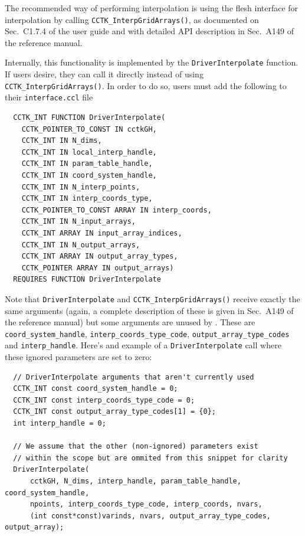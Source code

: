 The recommended way of performing interpolation is using the flesh interface for interpolation by calling \texttt{CCTK\_InterpGridArrays()}, as documented on Sec.~C1.7.4 of the \Cactus\space user guide and with detailed API description in Sec.~A149 of the \Cactus\space reference manual.

Internally, this functionality is implemented by the \texttt{DriverInterpolate} function. If users desire, they can call it directly instead of using \texttt{CCTK\_InterpGridArrays()}. In order to do so, users must add the following to their \texttt{interface.ccl} file
%
\begin{verbatim}
  CCTK_INT FUNCTION DriverInterpolate(
    CCTK_POINTER_TO_CONST IN cctkGH,
    CCTK_INT IN N_dims,
    CCTK_INT IN local_interp_handle,
    CCTK_INT IN param_table_handle,
    CCTK_INT IN coord_system_handle,
    CCTK_INT IN N_interp_points,
    CCTK_INT IN interp_coords_type,
    CCTK_POINTER_TO_CONST ARRAY IN interp_coords,
    CCTK_INT IN N_input_arrays,
    CCTK_INT ARRAY IN input_array_indices,
    CCTK_INT IN N_output_arrays,
    CCTK_INT ARRAY IN output_array_types,
    CCTK_POINTER ARRAY IN output_arrays)
  REQUIRES FUNCTION DriverInterpolate
\end{verbatim}

Note that \texttt{DriverInterpolate} and \texttt{CCTK\_InterpGridArrays()} receive exactly the same arguments (again, a complete description of these is given in Sec.~A149 of the \Cactus\space reference manual) but some arguments are unused by \CarpetX. These are \texttt{coord\_system\_handle}, \texttt{interp\_coords\_type\_code}, \texttt{output\_array\_type\_codes} and \texttt{interp\_handle}. Here's and example of a \texttt{DriverInterpolate} call where these ignored parameters are set to zero:

\begin{verbatim}
  // DriverInterpolate arguments that aren't currently used
  CCTK_INT const coord_system_handle = 0;
  CCTK_INT const interp_coords_type_code = 0;
  CCTK_INT const output_array_type_codes[1] = {0};
  int interp_handle = 0;

  // We assume that the other (non-ignored) parameters exist
  // within the scope but are ommited from this snippet for clarity
  DriverInterpolate(
      cctkGH, N_dims, interp_handle, param_table_handle, coord_system_handle,
      npoints, interp_coords_type_code, interp_coords, nvars,
      (int const*const)varinds, nvars, output_array_type_codes, output_array);
\end{verbatim}

